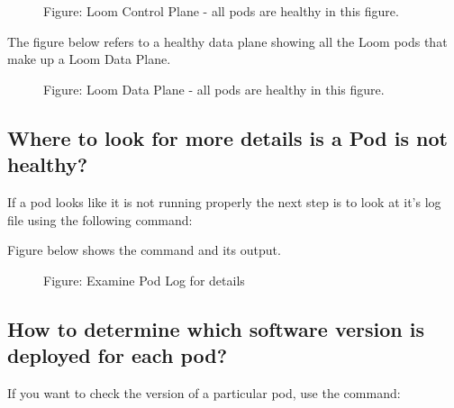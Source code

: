\documentclass[letterpaper,10pt,english]{sphinxmanual}
\begin{document}
\begin{figure}[htbp]
\centering
\capstart

\noindent{}
\caption{Figure: Loom Control Plane - all pods are healthy in this figure.}\label{\detokenize{loom_installation_guide:id5}}\end{figure}

The figure below refers to a healthy data plane showing all the Loom pods that make up a Loom Data Plane.

\begin{figure}[htbp]
\centering
\capstart

\noindent{}
\caption{Figure: Loom Data Plane - all pods are healthy in this figure.}\label{\detokenize{loom_installation_guide:id6}}\end{figure}


\subsection{Where to look for more details is a Pod is not healthy?}
\label{\detokenize{loom_installation_guide:where-to-look-for-more-details-is-a-pod-is-not-healthy}}
If a pod looks like it is not running properly the next step is to look at it’s log file using the following command:

\begin{sphinxVerbatim}[commandchars=\\\{\}]
    
\end{sphinxVerbatim}

Figure below shows the command and its output.

\begin{figure}[htbp]
\centering
\capstart

\noindent{}
\caption{Figure: Examine Pod Log for details}\label{\detokenize{loom_installation_guide:id7}}\end{figure}


\subsection{How to determine which software version is deployed for each pod?}
\label{\detokenize{loom_installation_guide:how-to-determine-which-software-version-is-deployed-for-each-pod}}
If you want to check the version of a particular pod, use the command:
\end{document}
